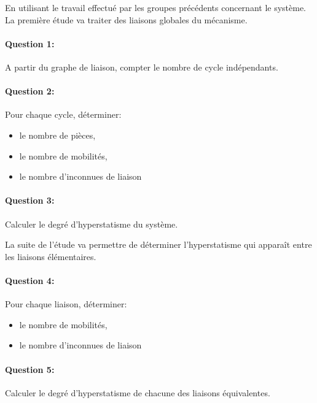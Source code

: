 

\ifdef{\public}{\cleardoublepage}{}



En utilisant le travail effectué par les groupes précédents concernant le système. La première étude va traiter des liaisons globales du mécanisme.

\paragraph{Question 1:} A partir du graphe de liaison, compter le nombre de cycle indépendants.

\paragraph{Question 2:} Pour chaque cycle, déterminer: 
 \begin{itemize}
  \item le nombre de pièces,
  \item le nombre de mobilités,
  \item le nombre d'inconnues de liaison
\end{itemize}

\paragraph{Question 3:} Calculer le degré d'hyperstatisme du système.

La suite de l'étude va permettre de déterminer l'hyperstatisme qui apparaît entre les liaisons élémentaires.

\paragraph{Question 4:} Pour chaque liaison, déterminer: 
 \begin{itemize}
  \item le nombre de mobilités,
  \item le nombre d'inconnues de liaison
\end{itemize}

\paragraph{Question 5:} Calculer le degré d'hyperstatisme de chacune des liaisons équivalentes.

